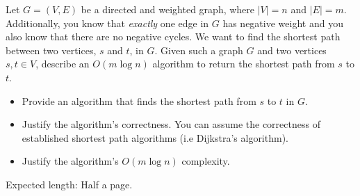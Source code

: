 \documentclass[12pt]{article}
\begin{document}

\begin{question}
Let $G = (V, E)$ be a directed and weighted graph, where $\lvert V \rvert = n$ and $\lvert E \rvert = m$. Additionally, you know that {\em exactly} one edge in $G$ has negative weight and you also know that there are no negative cycles. We want to find the shortest path between two vertices, $s$ and $t$, in $G$. Given such a graph $G$ and two vertices $s, t \in V$, describe an $O(m \log n)$ algorithm to return the shortest path from $s$ to $t$.
\end{question}

\begin{rubric}
\begin{itemize}
    \item Provide an algorithm that finds the shortest path from $s$ to $t$ in $G$.
    \item Justify the algorithm's correctness. You can assume the correctness of established shortest path algorithms (i.e Dijkstra's algorithm).
    \item Justify the algorithm's $O(m\log n)$ complexity.
\end{itemize}
Expected length: Half a page.
\end{rubric}

\begin{solution}
    
\end{solution}
\begin{attribution}
    
\end{attribution}
\end{document}
